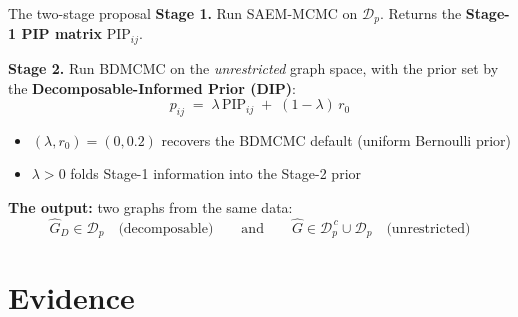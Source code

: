 \begin{frame}[t]{The two-stage proposal}
    \textbf{Stage 1.} Run SAEM-MCMC on $\mathcal{D}_p$. Returns the \textbf{Stage-1 PIP matrix} $\text{PIP}_{ij}$.
    \vspace{0.3cm}

    \textbf{Stage 2.} Run BDMCMC on the \emph{unrestricted} graph space, with the prior set by the \textbf{Decomposable-Informed Prior (DIP)}:
    \[
        \boxed{\;p_{ij} \;=\; \lambda\,\text{PIP}_{ij} \;+\; (1-\lambda)\, r_0\;}
    \]

    \begin{itemize}
        \item $(\lambda, r_0) = (0, 0.2)$ recovers the BDMCMC default (uniform Bernoulli prior)
        \item $\lambda > 0$ folds Stage-1 information into the Stage-2 prior
    \end{itemize}
    \vfill

    \textbf{The output:} two graphs from the same data:
    \[
        \hat G_D \in \mathcal{D}_p
        \quad \text{(decomposable)}
        \qquad \text{and} \qquad
        \hat G \in \mathcal{D}_p^{\,c} \cup \mathcal{D}_p
        \quad \text{(unrestricted)}
    \]
\end{frame}

\section{Evidence}

